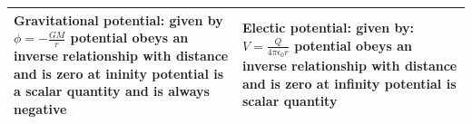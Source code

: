 \documentclass{scrbook}
\begin{document}
\begin{tabular}{| p{0.5\linewidth} | p{0.5\linewidth} |}
		\textbf{Gravitational potential: } \newline given by $\phi = -\frac{GM}{r}$ \newline potential obeys an inverse relationship with distance and is zero at ininity \newline potential is a scalar quantity and is always negative & \textbf{Electic potential: } \newline given by: $V = \frac{Q}{4\pi \epsilon_0 r}$ \newline potential obeys an inverse relationship with distance and is zero at infinity \newline potential is scalar quantity \\ \hline
	\end{tabular}

\printbibliography{}
\end{document}
